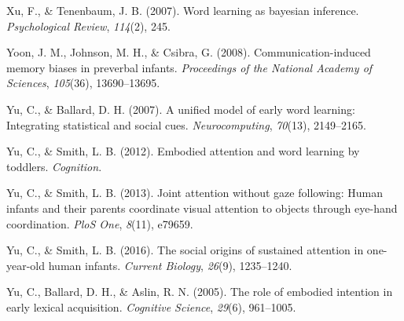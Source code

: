 \documentclass[a4paper,man,apacite,floatsintext]{apa6}
\begin{document}
\hypertarget{ref-xu2007word}{}
Xu, F., \& Tenenbaum, J. B. (2007). Word learning as bayesian inference.
\emph{Psychological Review}, \emph{114}(2), 245.

\hypertarget{ref-yoon2008communication}{}
Yoon, J. M., Johnson, M. H., \& Csibra, G. (2008). Communication-induced
memory biases in preverbal infants. \emph{Proceedings of the National
Academy of Sciences}, \emph{105}(36), 13690--13695.

\hypertarget{ref-yu2007unified}{}
Yu, C., \& Ballard, D. H. (2007). A unified model of early word
learning: Integrating statistical and social cues.
\emph{Neurocomputing}, \emph{70}(13), 2149--2165.

\hypertarget{ref-yu2012embodied}{}
Yu, C., \& Smith, L. B. (2012). Embodied attention and word learning by
toddlers. \emph{Cognition}.

\hypertarget{ref-yu2013joint}{}
Yu, C., \& Smith, L. B. (2013). Joint attention without gaze following:
Human infants and their parents coordinate visual attention to objects
through eye-hand coordination. \emph{PloS One}, \emph{8}(11), e79659.

\hypertarget{ref-yu2016social}{}
Yu, C., \& Smith, L. B. (2016). The social origins of sustained
attention in one-year-old human infants. \emph{Current Biology},
\emph{26}(9), 1235--1240.

\hypertarget{ref-yu2005role}{}
Yu, C., Ballard, D. H., \& Aslin, R. N. (2005). The role of embodied
intention in early lexical acquisition. \emph{Cognitive Science},
\emph{29}(6), 961--1005.


\end{document}
